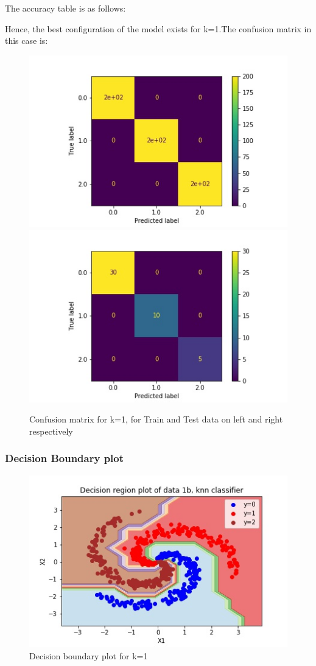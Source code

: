 \documentclass[11pt,a4paper]{article}
\newcommand{\noi}{\noindent}
\begin{document}
The accuracy table is as follows:
% 

\noi 
Hence, the best configuration of the model exists for k=1.The confusion matrix in this case is:

\begin{figure}[H]
    \centering
    \includegraphics[scale=0.5]{images/1b_cm_knn_train.jpg}
    \includegraphics[scale=0.5]{images/1b_cm_knn_test.jpg}
    \caption{Confusion matrix for k=1, for Train and Test data on left and right respectively }
    \label{fig:1b_cm_knn}
\end{figure}

\subsubsection{Decision Boundary plot}

\begin{figure}[H]
    \centering
    \includegraphics{images/1b_knn_decision_region.jpg}
    \caption{Decision boundary plot for k=1}
    \label{fig:1b_decreg_knn}
\end{figure}
\end{document}

